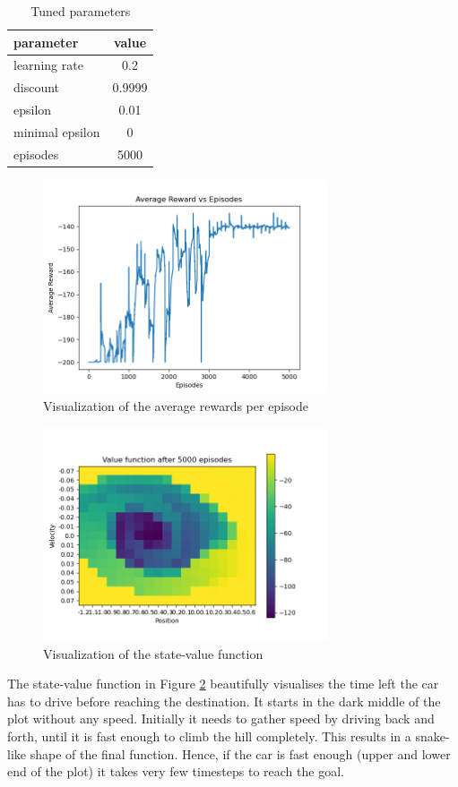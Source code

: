 \documentclass{article}
\begin{document}
\begin{table}
    \centering
    \begin{tabular}{l|c}
        parameter & value \\
        \hline
        learning rate & 0.2 \\
        discount & 0.9999 \\
        epsilon & 0.01 \\
        minimal epsilon & 0 \\
        episodes & 5000 \\
    \end{tabular}
    \caption{Tuned parameters}
    \label{tab:tuned_params}
\end{table}

\begin{figure}
    \centering
    \includegraphics[width=0.75\textwidth]{rewards.png}
    \caption{Visualization of the average rewards per episode}
    \label{fig:average_rewards}
\end{figure}

\begin{figure}
    \centering
    \includegraphics[width=0.75\textwidth]{state-value-function.png}
    \caption{Visualization of the state-value function}
    \label{fig:state-value-function}
\end{figure}

The state-value function in Figure \ref{fig:state-value-function} beautifully visualises the time left the car has to drive before reaching the destination. It starts in the dark middle of the plot without any speed. Initially it needs to gather speed by driving back and forth, until it is fast enough to climb the hill completely. This results in a snake-like shape of the final function. Hence, if the car is fast enough (upper and lower end of the plot) it takes very few timesteps to reach the goal.
\end{document}
